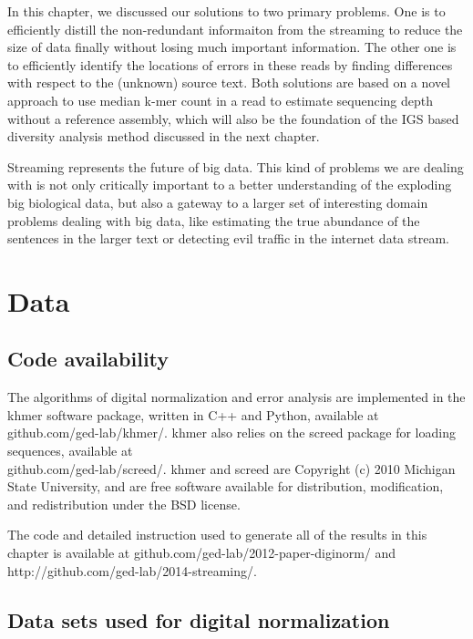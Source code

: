  In this chapter, we discussed our solutions to
two primary problems. One is to efficiently distill the non-redundant informaiton
from the streaming to reduce the size of data finally without losing much important 
information. The other one is to
efficiently identify the locations of errors in these reads by
finding differences with respect to the (unknown) source text. Both solutions 
are based on a novel approach to use median k-mer count in a read to estimate
sequencing depth without a reference assembly, which will also be the foundation
of the IGS based diversity analysis method discussed in the next chapter.

Streaming represents the future of big data. 
This kind of problems we are dealing with is not only critically important to 
a better understanding of the exploding big biological data, but also a 
gateway to a larger set of interesting domain problems
dealing with big data, like estimating the true abundance of the 
sentences in the larger text or detecting evil traffic in the internet data
stream.






\section{Data}

\subsection{Code availability}
The algorithms of digital normalization and error analysis are implemented 
 in the khmer software
package, written in C++ and Python, available at github.com/ged-lab/khmer/.
 khmer also relies on the screed package for loading
sequences, available at \\
github.com/ged-lab/screed/.
khmer and screed are Copyright (c) 2010 Michigan State University, and are free
software available for distribution, modification, and redistribution under the
BSD license.

The code and detailed instruction used to generate all of the results in this chapter is available at
github.com/ged-lab/2012-paper-diginorm/ and 
http://github.com/ged-lab/2014-streaming/. 

\subsection{Data sets used for digital normalization}

